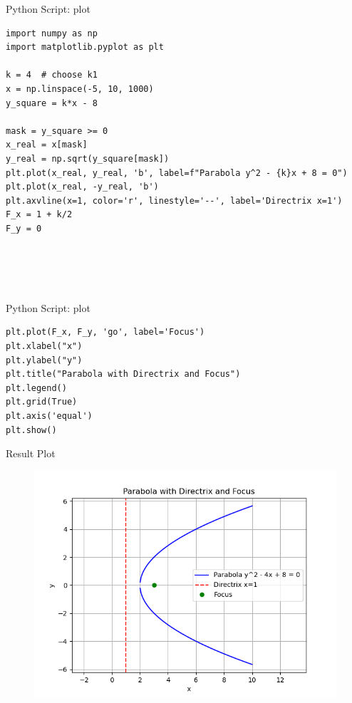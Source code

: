 \documentclass{beamer}
\numberwithin{equation}{section}
\theoremstyle{remark}
\begin{document}
\begin{frame}[fragile]{Python Script: plot }
\begin{verbatim}
import numpy as np
import matplotlib.pyplot as plt

k = 4  # choose k1
x = np.linspace(-5, 10, 1000)
y_square = k*x - 8

mask = y_square >= 0
x_real = x[mask]
y_real = np.sqrt(y_square[mask])
plt.plot(x_real, y_real, 'b', label=f"Parabola y^2 - {k}x + 8 = 0")
plt.plot(x_real, -y_real, 'b')
plt.axvline(x=1, color='r', linestyle='--', label='Directrix x=1')
F_x = 1 + k/2
F_y = 0





\end{verbatim}
\end{frame}
\begin{frame}[fragile]{Python Script: plot }
\begin{verbatim}
plt.plot(F_x, F_y, 'go', label='Focus')
plt.xlabel("x")
plt.ylabel("y")
plt.title("Parabola with Directrix and Focus")
plt.legend()
plt.grid(True)
plt.axis('equal')
plt.show()

\end{verbatim}
\end{frame}

\begin{frame}{Result Plot}
 \begin{figure}[H]
     \centering
     \includegraphics[width=0.8\columnwidth]{Figs/Fig1.png}
     \caption*{}
     \label{fig:fig1}
 \end{figure}
 
\end{frame}
\end{document}

